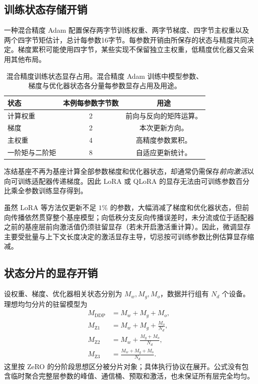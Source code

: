 \documentclass[../textbook.tex]{subfiles}
\begin{document}
\subsection{训练状态存储开销}
一种混合精度 Adam 配置保存两字节训练权重、两字节梯度、四字节主权重以及两个四字节矩估计，总计每参数16字节。每参数开销由所保存的状态与精度共同决定。梯度累积可能使用四字节，某些实现不保留独立主权重，低精度优化器又会采用其他布局。

\begin{table}[htbp]
\centering
\caption[混合精度训练状态显存占用]{混合精度训练状态显存占用。混合精度 Adam 训练中模型参数、梯度与优化器状态各分量每参数显存占用及用途。}\label{tab:training-state-memory}
\begin{tabular}{lcc}
\toprule 状态 & 本例每参数字节数 & 用途\\\midrule
计算权重 & 2 & 前向与反向的矩阵运算。\\
梯度 & 2 & 本次更新方向。\\
主权重 & 4 & 高精度参数累积。\\
一阶矩与二阶矩 & 8 & 自适应更新统计。\\\bottomrule
\end{tabular}
\end{table}
冻结基座不再为基座计算全部参数梯度和优化器状态，却通常仍需保存\emph{前向激活}以向可训练适配器传递梯度。因此 LoRA 或 QLoRA 的显存无法由可训练参数百分比乘全参数训练显存得到。

\begin{warning}[参数高效微调的显存估算陷阱]
虽然 LoRA 等方法仅更新不足 $1\%$ 的参数，大幅消减了梯度和优化器状态，但前向传播依然贯穿整个基座模型；向低秩分支反向传播误差时，未分流或位于适配器之前的基座层前向激活值仍须驻留显存（若未开启激活重计算）。因此，微调显存主要受批量与上下文长度决定的激活显存主导，切忌按可训练参数比例估算显存缩减。
\end{warning}

\subsection{状态分片的显存开销}
设权重、梯度、优化器相关状态分别为 $M_w,M_g,M_o$，数据并行组有 $N_d$ 个设备。理想均匀分片的驻留模型为
\begin{align}
 M_{\mathrm{DDP}}&=M_w+M_g+M_o,\\
 M_{\mathrm{Z1}}&=M_w+M_g+\frac{M_o}{N_d},\\
 M_{\mathrm{Z2}}&=M_w+\frac{M_g+M_o}{N_d},\\
 M_{\mathrm{Z3}}&=\frac{M_w+M_g+M_o}{N_d}.
\end{align}
这里按 ZeRO 的分阶段思想区分被分片对象\cite{rajbhandari2020zero}；具体执行协议在展开。公式没有包含临时聚合完整层参数的峰值、通信桶、预取和激活，也未保证所有层完全均匀。
\end{document}
